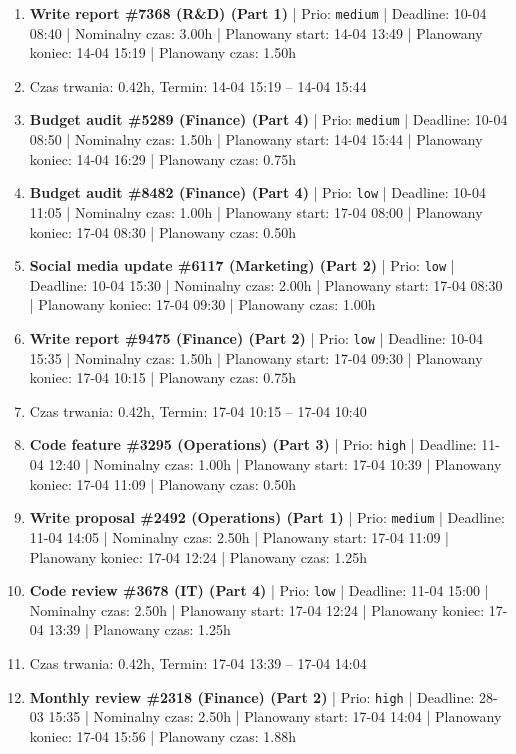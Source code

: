 {\begin{enumerate}
  \item [\textbf{14633}] \textbf{Write report \#7368 (R\&D) (Part 1)} | Prio: \texttt{medium} | Deadline: 10-04 08:40 | Nominalny czas: 3.00h | Planowany start: 14-04 13:49 | Planowany koniec: 14-04 15:19 | Planowany czas: 1.50h
  \item [\textbf{PRZERWA}] Czas trwania: 0.42h, Termin: 14-04 15:19 -- 14-04 15:44
  \item [\textbf{14630}] \textbf{Budget audit \#5289 (Finance) (Part 4)} | Prio: \texttt{medium} | Deadline: 10-04 08:50 | Nominalny czas: 1.50h | Planowany start: 14-04 15:44 | Planowany koniec: 14-04 16:29 | Planowany czas: 0.75h
  \item [\textbf{14694}] \textbf{Budget audit \#8482 (Finance) (Part 4)} | Prio: \texttt{low} | Deadline: 10-04 11:05 | Nominalny czas: 1.00h | Planowany start: 17-04 08:00 | Planowany koniec: 17-04 08:30 | Planowany czas: 0.50h
  \item [\textbf{14700}] \textbf{Social media update \#6117 (Marketing) (Part 2)} | Prio: \texttt{low} | Deadline: 10-04 15:30 | Nominalny czas: 2.00h | Planowany start: 17-04 08:30 | Planowany koniec: 17-04 09:30 | Planowany czas: 1.00h
  \item [\textbf{14685}] \textbf{Write report \#9475 (Finance) (Part 2)} | Prio: \texttt{low} | Deadline: 10-04 15:35 | Nominalny czas: 1.50h | Planowany start: 17-04 09:30 | Planowany koniec: 17-04 10:15 | Planowany czas: 0.75h
  \item [\textbf{PRZERWA}] Czas trwania: 0.42h, Termin: 17-04 10:15 -- 17-04 10:40
  \item [\textbf{14608}] \textbf{Code feature \#3295 (Operations) (Part 3)} | Prio: \texttt{high} | Deadline: 11-04 12:40 | Nominalny czas: 1.00h | Planowany start: 17-04 10:39 | Planowany koniec: 17-04 11:09 | Planowany czas: 0.50h
  \item [\textbf{14668}] \textbf{Write proposal \#2492 (Operations) (Part 1)} | Prio: \texttt{medium} | Deadline: 11-04 14:05 | Nominalny czas: 2.50h | Planowany start: 17-04 11:09 | Planowany koniec: 17-04 12:24 | Planowany czas: 1.25h
  \item [\textbf{14699}] \textbf{Code review \#3678 (IT) (Part 4)} | Prio: \texttt{low} | Deadline: 11-04 15:00 | Nominalny czas: 2.50h | Planowany start: 17-04 12:24 | Planowany koniec: 17-04 13:39 | Planowany czas: 1.25h
  \item [\textbf{PRZERWA}] Czas trwania: 0.42h, Termin: 17-04 13:39 -- 17-04 14:04
  \item [\textbf{14618}] \textbf{Monthly review \#2318 (Finance) (Part 2)} | Prio: \texttt{high} | Deadline: 28-03 15:35 | Nominalny czas: 2.50h | Planowany start: 17-04 14:04 | Planowany koniec: 17-04 15:56 | Planowany czas: 1.88h

\end{enumerate}}
